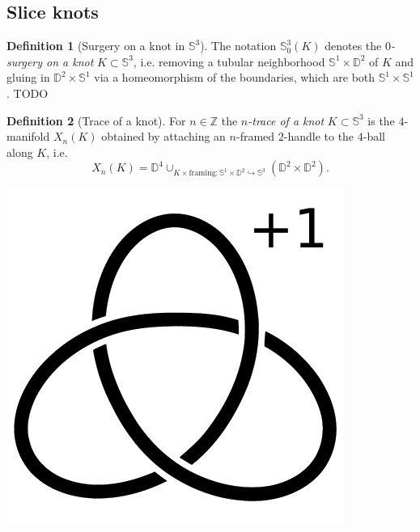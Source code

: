 \documentclass[nobib]{tufte-book} %
\theoremstyle{definition}
\newtheorem{definition}{Definition}
\theoremstyle{remark}
\newcommand{\sphere}[1]{\mathbb{S}^{#1}}
\newcommand{\disk}[1]{\mathbb{D}^{#1}}
\newcommand{\Z}{\mathbb{Z}}
\begin{document}
\subsection{Slice knots}

\begin{definition}[Surgery on a knot in $\sphere{3}$]
	The notation $\sphere{3}_{0}(K)$ denotes the \textit{$0$-surgery on a knot}
	$K \subset \sphere{3}$, i.e. removing a tubular neighborhood
	$\sphere{1} \times \disk{2}$ of $K$ and gluing in $\disk{2} \times \sphere{1}$
	via a homeomorphism of the boundaries, which are both $\sphere{1} \times \sphere{1}$.
	TODO %
\end{definition}

\begin{definition}[Trace of a knot]
	For $n \in \Z$ the \textit{$n$-trace of a knot} 
	$K \subset \sphere{3}$
	is the $4$-manifold $X_{n}(K)$ obtained by attaching an $n$-framed $2$-handle to the $4$-ball along $K$,
	i.e. 
	\begin{equation*}
	X_{n}(K) = \disk{4} \cup_{K \times \textrm{framing} \colon \sphere{1} \times \disk{2} \hookrightarrow \sphere{3}} (\disk{2} \times \disk{2}).
	\end{equation*}
	
	\begin{marginfigure}
		\begin{center}
			\includegraphics[width=0.5\linewidth]{./pictures/right_handed_trefoil_+1_surgery.pdf}
		\end{center}
		\caption{
			A Kirby diagram for $X_{n}(K)$ is given just by the knot $K$ with the framing $n$ written next to it.
			For example, here is a Kirby diagram representing the $1$-trace
			$X_1(\textrm{right handed trefoil})$.
			The boundary of this $4$-manifold is the $+1$-surgery
			$\sphere{3}_{+1}(\textrm{right handed trefoil})$,
			a possible description of the Poincar\'e homology sphere.}
		\label{fig:right_handed_trefoil_+1_surgery}
	\end{marginfigure}
\end{definition}
\end{document}
